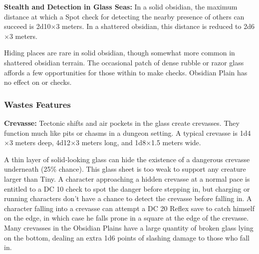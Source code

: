
\textbf{Stealth and Detection in Glass Seas:} In a solid obsidian, the maximum distance at which a Spot check for detecting the nearby presence of others can succeed is 2d10$\times$3 meters. In a shattered obsidian, this distance is reduced to 2d6$\times$3 meters.

Hiding places are rare in solid obsidian, though somewhat more common in shattered obsidian terrain. The occasional patch of dense rubble or razor glass affords a few opportunities for those within to make  checks. Obsidian Plain has no effect on  or  checks.

\subsubsection{Wastes Features}

\textbf{Crevasse:} Tectonic shifts and air pockets in the glass create crevasses. They function much like pits or chasms in a dungeon setting. A typical crevasse is 1d4$\times$3 meters deep, 4d12$\times$3 meters long, and 1d8$\times$1.5 meters wide.

A thin layer of solid-looking glass can hide the existence of a dangerous crevasse underneath (25\% chance). This glass sheet is too weak to support any creature larger than Tiny. A character approaching a hidden crevasse at a normal pace is entitled to a DC 10  check to spot the danger before stepping in, but charging or running characters don't have a chance to detect the crevasse before falling in. A character falling into a crevasse can attempt a DC 20 Reflex save to catch himself on the edge, in which case he falls prone in a square at the edge of the crevasse. Many crevasses in the Obsidian Plains have a large quantity of broken glass lying on the bottom, dealing an extra 1d6 points of slashing damage to those who fall in.

